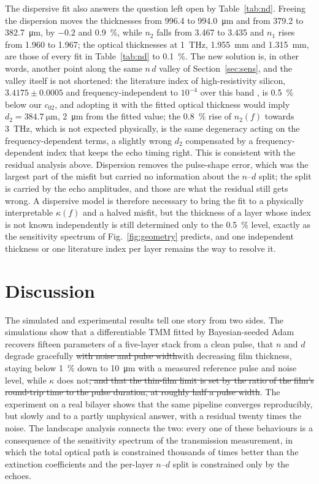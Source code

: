 \documentclass{optica-article}
\DeclareRobustCommand{\chg}[1]{{\color{blue}#1}}
\DeclareRobustCommand{\del}[1]{{\color{red}\sout{#1}}}
\newcommand{\kap}{\kappa}
\begin{document}
The dispersive fit also answers the question left open by Table~\ref{tab:nd}. Freeing the dispersion moves the thicknesses from 996.4 to \SI{994.0}{\micro\metre} and from 379.2 to \SI{382.7}{\micro\metre}, by $-0.2$ and \SI{+0.9}{\percent}, while $n_2$ falls from 3.467 to 3.435 and $n_1$ rises from 1.960 to 1.967; the optical thicknesses at \SI{1}{THz}, \SI{1.955}{\milli\metre} and \SI{1.315}{\milli\metre}, are those of every fit in Table~\ref{tab:nd} to \SI{0.1}{\percent}. The new solution is, in other words, another point along the same $n\,d$ valley of Section~\ref{sec:sens}, and the valley itself is not shortened: the literature index of high-resistivity silicon, $3.4175\pm0.0005$ and frequency-independent to $10^{-4}$ over this band \cite{Dai2004}, is \SI{0.5}{\percent} below our $c_{02}$, and adopting it with the fitted optical thickness would imply $d_2=\SI{384.7}{\micro\metre}$, \SI{2}{\micro\metre} from the fitted value; the \SI{0.8}{\percent} rise of $n_2(f)$ towards \SI{3}{THz}, which is not expected physically, is the same degeneracy acting on the frequency-dependent terms, a slightly wrong $d_2$ compensated by a frequency-dependent index that keeps the echo timing right. This is consistent with the residual analysis above. Dispersion removes the pulse-shape error, which was the largest part of the misfit but carried no information about the $n$--$d$ split; the split is carried by the echo amplitudes, and those are what the residual still gets wrong. A dispersive model is therefore necessary to bring the fit to a physically interpretable $\kap(f)$ and a halved misfit, but the thickness of a layer whose index is not known independently is still determined only to the \SI{0.5}{\percent} level, exactly as the sensitivity spectrum of Fig.~\ref{fig:geometry} predicts, and one independent thickness or one literature index per layer remains the way to resolve it.

\section{Discussion}\label{sec:discussion}
The simulated and experimental results tell one story from two sides. The simulations show that a differentiable TMM fitted by Bayesian-seeded Adam recovers fifteen parameters of a five-layer stack from a clean pulse, that $n$ and $d$ degrade gracefully \del{with noise and pulse width}\chg{with decreasing film thickness, staying below \SI{1}{\percent} down to \SI{10}{\micro\metre} with a measured reference pulse and noise level,} while $\kap$ does not\del{, and that the thin-film limit is set by the ratio of the film's round-trip time to the pulse duration, at roughly half a pulse width}. The experiment on a real bilayer shows that the same pipeline converges reproducibly, but slowly and to a partly unphysical answer, with a residual twenty times the noise. The landscape analysis connects the two: every one of these behaviours is a consequence of the sensitivity spectrum of the transmission measurement, in which the total optical path is constrained thousands of times better than the extinction coefficients and the per-layer $n$--$d$ split is constrained only by the echoes.
\end{document}
